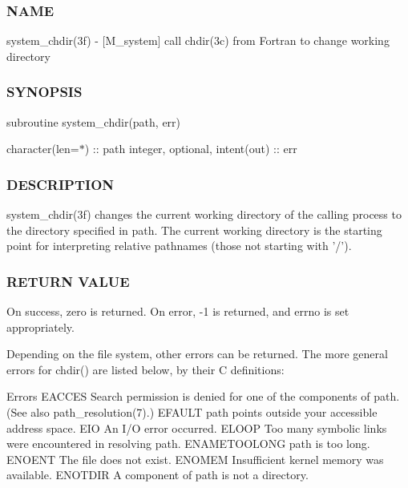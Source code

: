 \subsubsection*{N\+A\+ME}

system\+\_\+chdir(3f) -\/ \mbox{[}M\+\_\+system\mbox{]} call chdir(3c) from Fortran to change working directory \subsubsection*{S\+Y\+N\+O\+P\+S\+IS}

subroutine system\+\_\+chdir(path, err)

character(len=$\ast$) \+:\+: path integer, optional, intent(out) \+:\+: err

\subsubsection*{D\+E\+S\+C\+R\+I\+P\+T\+I\+ON}

\begin{DoxyVerb}system_chdir(3f) changes the current working directory of the calling
process to the directory specified in path. The current working
directory is the starting point for interpreting relative pathnames
(those not starting with '/').
\end{DoxyVerb}


\subsubsection*{R\+E\+T\+U\+RN V\+A\+L\+UE}

\begin{DoxyVerb}On success, zero is returned. On error, -1 is returned, and errno is
set appropriately.


Depending on the file system, other errors can be returned. The more
general errors for chdir() are listed below, by their C definitions:

Errors
EACCES        Search permission is denied for one of the components of path.
              (See also path_resolution(7).)
EFAULT        path points outside your accessible address space.
EIO           An I/O error occurred.
ELOOP         Too many symbolic links were encountered in resolving path.
ENAMETOOLONG  path is too long.
ENOENT        The file does not exist.
ENOMEM        Insufficient kernel memory was available.
ENOTDIR       A component of path is not a directory.
\end{DoxyVerb}


